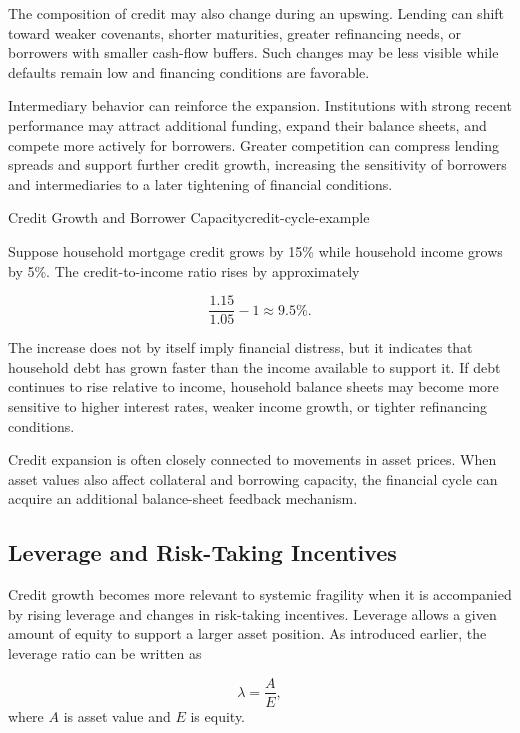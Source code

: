 The composition of credit may also change during an upswing. Lending can shift toward weaker covenants, shorter maturities, greater refinancing needs, or borrowers with smaller cash-flow buffers. Such changes may be less visible while defaults remain low and financing conditions are favorable.

Intermediary behavior can reinforce the expansion. Institutions with strong recent performance may attract additional funding, expand their balance sheets, and compete more actively for borrowers. Greater competition can compress lending spreads and support further credit growth, increasing the sensitivity of borrowers and intermediaries to a later tightening of financial conditions.

\begin{example}{Credit Growth and Borrower Capacity}{credit-cycle-example}

Suppose household mortgage credit grows by 15\% while household income grows by 5\%. The credit-to-income ratio rises by approximately

\[
\frac{1.15}{1.05}-1
\approx
9.5\%.
\]

The increase does not by itself imply financial distress, but it indicates that household debt has grown faster than the income available to support it. If debt continues to rise relative to income, household balance sheets may become more sensitive to higher interest rates, weaker income growth, or tighter refinancing conditions.

\end{example}

Credit expansion is often closely connected to movements in asset prices. When asset values also affect collateral and borrowing capacity, the financial cycle can acquire an additional balance-sheet feedback mechanism.

\subsection{Leverage and Risk-Taking Incentives}

Credit growth becomes more relevant to systemic fragility when it is accompanied by rising leverage and changes in risk-taking incentives. Leverage allows a given amount of equity to support a larger asset position. As introduced earlier, the leverage ratio can be written as

\begin{equation}
\lambda=\frac{A}{E},
\label{eq:ch21-leverage-ratio}
\end{equation}
where \(A\) is asset value and \(E\) is equity.

